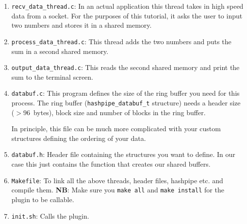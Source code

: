 \documentclass[12pt]{article}
\begin{document}
\begin{enumerate}
\item {\tt recv\_data\_thread.c}: In an actual application this thread takes in 
high speed data from a socket. For the purposes of this tutorial, it asks the 
user to input two numbers and stores it in a shared memory.

\item {\tt process\_data\_thread.c}: This thread adds the two numbers and puts
the sum in a second shared memory.

\item {\tt output\_data\_thread.c}: This reads the second shared memory and print 
the sum to the terminal screen.

\item {\tt databuf.c}: This program defines the size of the ring buffer you need 
for this process. The ring buffer ({\tt hashpipe\_databuf\_t} structure) needs a 
header size ($>96$~bytes), block size and number of blocks in the ring buffer.

In principle, this file can be much more complicated with your custom structures 
defining the ordering of your data.

\item {\tt databuf.h}: Header file containing the structures you want to define. 
In our case this just contains the function that creates our shared buffers.

\item {\tt Makefile}: To link all the above threads, header files, hashpipe etc. 
and compile them. {\bf NB}: Make sure you {\tt make all} and {\tt make install} 
for the plugin to be callable. 

\item {\tt init.sh}: Calls the plugin.

\end{enumerate}
\end{document}
